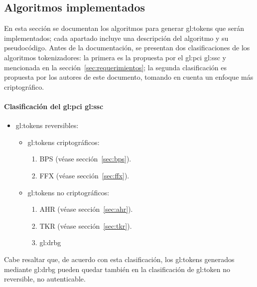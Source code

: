 %
%

\subsection{Algoritmos implementados}
\label{sec:algoritmos}

En esta sección se documentan los algoritmos para generar \glspl{gl:token}
que serán implementados; cada apartado incluye una descripción del
algoritmo y su pseudocódigo. Antes de la documentación, se presentan
dos clasificaciones de los algoritmos tokenizadores: la primera es la propuesta
por el \gls{gl:pci} \gls{gl:ssc} y mencionada en la
sección~\ref{sec:requerimientos}; la segunda clasificación es propuesta por los
autores de este documento, tomando en cuenta un enfoque más criptográfico.

\paragraph{Clasificación del \gls{gl:pci} \gls{gl:ssc}}
\begin{itemize}
  \item \Glspl{gl:token} reversibles:
    \begin{itemize}
      \item \Glspl{gl:token} criptográficos:
        \begin{enumerate}
          \item BPS (véase sección~\ref{sec:bps}).
          \item FFX (véase sección~\ref{sec:ffx}).
        \end{enumerate}
      \item \Glspl{gl:token} no criptográficos:
        \begin{enumerate}
          \item AHR (véase sección~\ref{sec:ahr}).
          \item TKR (véase sección~\ref{sec:tkr}).
          \item \gls{gl:drbg}
        \end{enumerate}
    \end{itemize}
\end{itemize}

Cabe resaltar que, de acuerdo con esta clasificación, los \glspl{gl:token}
generados mediante \gls{gl:drbg} pueden quedar también en la clasificación
de \gls{gl:token} no reversible, no autenticable.

